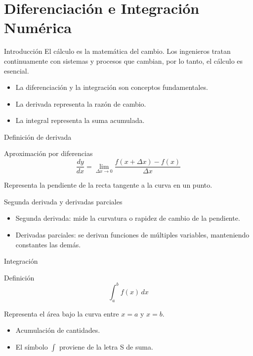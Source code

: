 \documentclass[main.tex]{subfiles}
\begin{document}
\section{Diferenciación e Integración Numérica}


\begin{frame}{Introducción}
  El cálculo es la matemática del cambio. Los ingenieros tratan continuamente con sistemas y procesos que cambian, por lo tanto, el cálculo es esencial.
  \begin{itemize}
    \item La diferenciación y la integración son conceptos fundamentales.
    \item La derivada representa la razón de cambio.
    \item La integral representa la suma acumulada.
  \end{itemize}
\end{frame}

\begin{frame}{Definición de derivada}
  \begin{block}{Aproximación por diferencias}
    \[ \frac{dy}{dx} = \lim_{\Delta x \to 0} \frac{f(x + \Delta x) - f(x)}{\Delta x} \]
  \end{block}
  Representa la pendiente de la recta tangente a la curva en un punto.
\end{frame}

\begin{frame}{Segunda derivada y derivadas parciales}
  \begin{itemize}
    \item Segunda derivada: mide la curvatura o rapidez de cambio de la pendiente.
    \item Derivadas parciales: se derivan funciones de múltiples variables, manteniendo constantes las demás.
  \end{itemize}
\end{frame}

\begin{frame}{Integración}
  \begin{block}{Definición}
    \[ \int_a^b f(x) \, dx \]
  \end{block}
  Representa el área bajo la curva entre \( x = a \) y \( x = b \).
  \begin{itemize}
    \item Acumulación de cantidades.
    \item El símbolo \( \int \) proviene de la letra S de suma.
  \end{itemize}
\end{frame}
\end{document}
